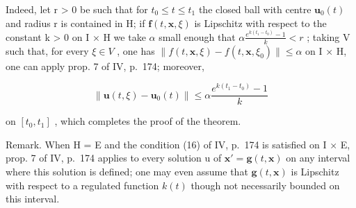 Indeed, let r \textgreater{} 0 be such that for \(t_{0} \leqslant t \leqslant t_{1}\) the closed ball with centre \(\mathbf{u}_{0}(t)\) and radius r is contained in H; if \(\mathbf{f}(t, \mathbf{x}, \xi)\) is Lipschitz with respect to the constant k \textgreater{} 0 on I × H we take \(\alpha\) small enough that \(\alpha \frac{e^{k(t_{1}-t_{0})} - 1}{k} < r\) ; taking V such that, for every \(\xi \in V\) , one has \(\|f(t, \mathbf{x}, \xi) - f(t, \mathbf{x}, \xi_{0})\| \leqslant \alpha\) on I × H, one can apply prop. 7 of IV, p.~174; moreover,

\[
\| \mathbf {u} (t, \xi) - \mathbf {u} _ {0} (t) \| \leqslant \alpha \frac {e ^ {k \left(t _ {1} - t _ {0}\right)} - 1}{k}
\]

on \([t_{0}, t_{1}]\) , which completes the proof of the theorem.

Remark. When H = E and the condition (16) of IV, p.~174 is satisfied on I × E, prop. 7 of IV, p.~174 applies to every solution u of \(\mathbf{x}' = \mathbf{g}(t, \mathbf{x})\) on any interval where this solution is defined; one may even assume that \(\mathbf{g}(t,\mathbf{x})\) is Lipschitz with respect to a regulated function \(k(t)\) though not necessarily bounded on this interval.

